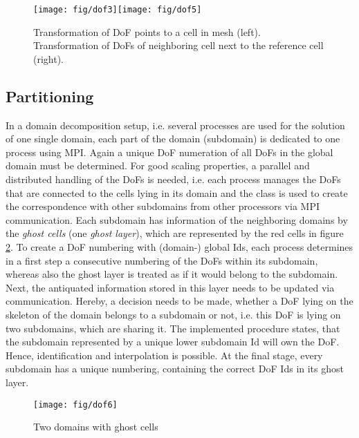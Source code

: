 %
\begin{figure}
\noindent \begin{centering}
\texttt{[image: fig/dof3]}\hfill{}\hfill{}\texttt{[image: fig/dof5]}
\par\end{centering}

\caption{\label{fig:Transforming-DoF-points}Transformation of DoF points to a cell
in mesh (left). Transformation of DoFs of neighboring cell next to the reference cell (right).}

\end{figure}

\subsection{Partitioning}

In a domain decomposition setup, i.e. several processes are used for
the solution of one single domain, each part of the domain (subdomain)
is dedicated to one process using MPI. Again a unique DoF numeration
of all DoFs in the global domain must be determined. For good scaling
properties, a parallel and distributed handling of the DoFs is needed,
i.e. each process manages the DoFs that are connected to the cells
lying in its domain and the class  is used to create
the correspondence with other subdomains from other processors via
MPI communication. Each subdomain has information of the neighboring
domains by the \emph{ghost cells} (one \emph{ghost layer}), which
are represented by the red cells in figure \ref{fig:Two-domains-with}.
To create a DoF numbering with (domain-) global Ids, each process determines
in a first step a consecutive numbering of the DoFs within its subdomain,
whereas also the ghost layer is treated as if it would belong to the
subdomain. Next, the antiquated information stored in this layer needs
to be updated via communication. Hereby, a decision needs to be made,
whether a DoF lying on the skeleton of the domain belongs to a subdomain
or not, i.e. this DoF is lying on two subdomains, which are sharing
it. The implemented procedure states, that the subdomain represented
by a unique lower subdomain Id will own the DoF. Hence, identification
and interpolation is possible. At the final stage,
every subdomain has a unique numbering, containing the correct DoF
Ids in its ghost layer.
\begin{figure}
  \centering
  \texttt{[image: fig/dof6]}
  \caption{\label{fig:Two-domains-with}Two domains with ghost cells}
\end{figure}
